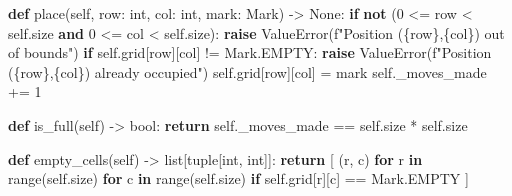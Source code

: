 \documentclass[11pt]{article}
\newenvironment{Shaded}{\begin{snugshade}}{\end{snugshade}}
\newcommand{\BuiltInTok}[1]{\textcolor[rgb]{0.50,0.55,0.55}{#1}}
\newcommand{\ControlFlowTok}[1]{\textcolor[rgb]{0.99,0.74,0.29}{\textbf{#1}}}
\newcommand{\DecValTok}[1]{\textcolor[rgb]{0.96,0.45,0.00}{#1}}
\newcommand{\KeywordTok}[1]{\textcolor[rgb]{0.81,0.81,0.76}{\textbf{#1}}}
\newcommand{\NormalTok}[1]{\textcolor[rgb]{0.81,0.81,0.76}{#1}}
\newcommand{\OperatorTok}[1]{\textcolor[rgb]{0.81,0.81,0.76}{#1}}
\newcommand{\PreprocessorTok}[1]{\textcolor[rgb]{0.15,0.68,0.38}{#1}}
\newcommand{\SpecialCharTok}[1]{\textcolor[rgb]{0.24,0.68,0.91}{#1}}
\newcommand{\SpecialStringTok}[1]{\textcolor[rgb]{0.85,0.27,0.33}{#1}}
\newcommand{\VariableTok}[1]{\textcolor[rgb]{0.15,0.68,0.68}{#1}}
\begin{document}
\begin{Shaded}
\begin{Highlighting}[]
    \KeywordTok{def}\NormalTok{ place(}\VariableTok{self}\NormalTok{, row: }\BuiltInTok{int}\NormalTok{, col: }\BuiltInTok{int}\NormalTok{, mark: Mark) }\OperatorTok{{-}\textgreater{}} \VariableTok{None}\NormalTok{:}
        \ControlFlowTok{if} \KeywordTok{not}\NormalTok{ (}\DecValTok{0} \OperatorTok{\textless{}=}\NormalTok{ row }\OperatorTok{\textless{}} \VariableTok{self}\NormalTok{.size }\KeywordTok{and} \DecValTok{0} \OperatorTok{\textless{}=}\NormalTok{ col }\OperatorTok{\textless{}} \VariableTok{self}\NormalTok{.size):}
            \ControlFlowTok{raise} \PreprocessorTok{ValueError}\NormalTok{(}\SpecialStringTok{f"Position (}\SpecialCharTok{\{}\NormalTok{row}\SpecialCharTok{\}}\SpecialStringTok{,}\SpecialCharTok{\{}\NormalTok{col}\SpecialCharTok{\}}\SpecialStringTok{) out of bounds"}\NormalTok{)}
        \ControlFlowTok{if} \VariableTok{self}\NormalTok{.grid[row][col] }\OperatorTok{!=}\NormalTok{ Mark.EMPTY:}
            \ControlFlowTok{raise} \PreprocessorTok{ValueError}\NormalTok{(}\SpecialStringTok{f"Position (}\SpecialCharTok{\{}\NormalTok{row}\SpecialCharTok{\}}\SpecialStringTok{,}\SpecialCharTok{\{}\NormalTok{col}\SpecialCharTok{\}}\SpecialStringTok{) already occupied"}\NormalTok{)}
        \VariableTok{self}\NormalTok{.grid[row][col] }\OperatorTok{=}\NormalTok{ mark}
        \VariableTok{self}\NormalTok{.\_moves\_made }\OperatorTok{+=} \DecValTok{1}

    \KeywordTok{def}\NormalTok{ is\_full(}\VariableTok{self}\NormalTok{) }\OperatorTok{{-}\textgreater{}} \BuiltInTok{bool}\NormalTok{:}
        \ControlFlowTok{return} \VariableTok{self}\NormalTok{.\_moves\_made }\OperatorTok{==} \VariableTok{self}\NormalTok{.size }\OperatorTok{*} \VariableTok{self}\NormalTok{.size}

    \KeywordTok{def}\NormalTok{ empty\_cells(}\VariableTok{self}\NormalTok{) }\OperatorTok{{-}\textgreater{}} \BuiltInTok{list}\NormalTok{[}\BuiltInTok{tuple}\NormalTok{[}\BuiltInTok{int}\NormalTok{, }\BuiltInTok{int}\NormalTok{]]:}
        \ControlFlowTok{return}\NormalTok{ [}
\NormalTok{            (r, c)}
            \ControlFlowTok{for}\NormalTok{ r }\KeywordTok{in} \BuiltInTok{range}\NormalTok{(}\VariableTok{self}\NormalTok{.size)}
            \ControlFlowTok{for}\NormalTok{ c }\KeywordTok{in} \BuiltInTok{range}\NormalTok{(}\VariableTok{self}\NormalTok{.size)}
            \ControlFlowTok{if} \VariableTok{self}\NormalTok{.grid[r][c] }\OperatorTok{==}\NormalTok{ Mark.EMPTY}
\NormalTok{        ]}


\end{Highlighting}
\end{Shaded}
\end{document}
